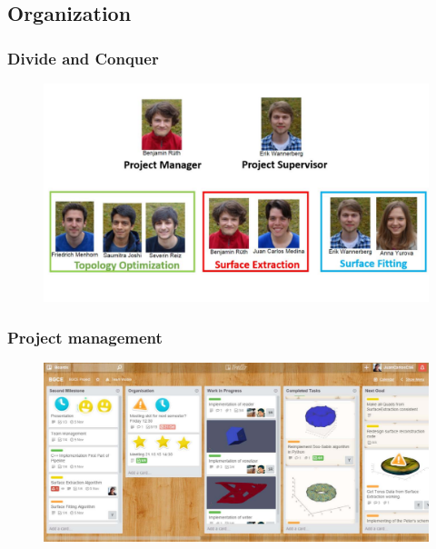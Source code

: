 \subsection{Organization}

\begin{frame}

	\frametitle{Divide and Conquer}

	\begin{figure}
	\includegraphics[scale=0.3]{Pictures/DC/organization.pdf}
	\end{figure}
	
\end{frame}

\begin{frame}

	\frametitle{Project management}

	\begin{figure}
	\includegraphics[scale=0.3]{Pictures/DC/Trello.pdf}
	\end{figure}
	
\end{frame}
